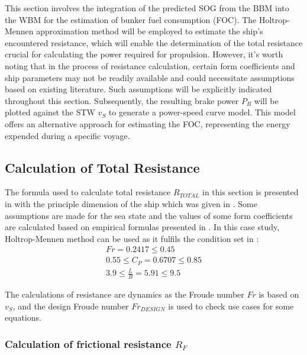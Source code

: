 This section involves the integration of the predicted SOG from the BBM into the WBM for the estimation of bunker fuel consumption (FOC). The Holtrop-Mennen approximation method will be employed to estimate the ship's encountered resistance, which will enable the determination of the total resistance crucial for calculating the power required for propulsion. However, it's worth noting that in the process of resistance calculation, certain form coefficients and ship parameters may not be readily available and could necessitate assumptions based on existing literature. Such assumptions will be explicitly indicated throughout this section. Subsequently, the resulting brake power $P_B$ will be plotted against the STW $v_S$ to generate a power-speed curve model. This model offers an alternative approach for estimating the FOC, representing the energy expended during a specific voyage.

\subsection{Calculation of Total Resistance}\label{sec:Rtot_calc_method}

The formula used to calculate total resistance $R_{TOTAL}$ in this section is presented in  with the principle dimension of the ship which was given in . Some assumptions are made for the sea state and the values of some form coefficients are calculated based on empirical formulas presented in . In this case study, Holtrop-Mennen method can be used as it fulfils the condition set in :
\begin{equation}
    \label{eqn:holtrop_cond_fulfill}
    \begin{gathered}
        Fr = 0.2417  \leqslant 0.45 \\
        0.55 \leqslant C_P = 0.6707 \leqslant 0.85 \\
        3.9 \leqslant \frac{L}{B} = 5.91 \leqslant 9.5
    \end{gathered}
\end{equation}

The calculations of resistance are dynamics as the Froude number $Fr$ is based on $v_S$, and the design Froude number $Fr_{DESIGN}$ is used to check use cases for some equations.

\subsubsection*{Calculation of frictional resistance $R_F$}

